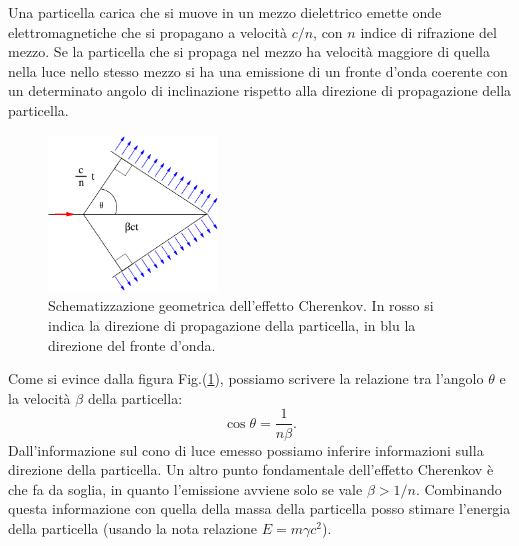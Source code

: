 Una particella carica che si muove in un mezzo dielettrico emette onde elettromagnetiche che si propagano a velocità $c/n$, con $n$ indice di rifrazione del mezzo. Se la particella che si propaga nel mezzo ha velocità maggiore di quella nella luce nello stesso mezzo si ha una emissione di un fronte d'onda coerente con un determinato angolo di inclinazione rispetto alla direzione di propagazione della particella. 

\begin{figure}[H]  
    \centering
    \includegraphics[width=0.4\textwidth]{img/cherenkov_effect.png}
    \caption{Schematizzazione geometrica dell'effetto Cherenkov. In rosso si indica la direzione di propagazione della particella, in blu la direzione del fronte d'onda.}
    \label{img:cherenkov_effect}
\end{figure}
Come si evince dalla figura Fig.(\ref{img:cherenkov_effect}), possiamo scrivere la relazione tra l'angolo $\theta$ e la velocità $\beta$ della particella:
\begin{equation*}
    \cos \theta = \frac{1}{n\beta}.
\end{equation*}
Dall'informazione sul cono di luce emesso possiamo inferire informazioni sulla direzione della particella. Un altro punto fondamentale dell'effetto Cherenkov è che fa da soglia, in quanto l'emissione avviene solo se vale $\beta > 1/n$. Combinando questa informazione con quella della massa della particella posso stimare l'energia della particella (usando la nota relazione $E = m\gamma c^2$).